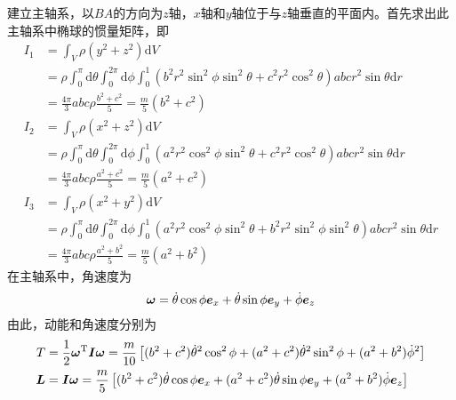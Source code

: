 \begin{solution}
建立主轴系，以$BA$的方向为$z$轴，$x$轴和$y$轴位于与$z$轴垂直的平面内。首先求出此主轴系中椭球的惯量矩阵，即
\begin{align*}
	I_1 & = \int_V \rho (y^2+z^2) \mathrm{d} V \\
	& = \rho \int_0^\pi \mathrm{d} \theta \int_0^{2\pi} \mathrm{d} \phi \int_0^1 (b^2r^2\sin^2 \phi \sin^2 \theta + c^2r^2 \cos^2 \theta) abc r^2 \sin \theta \mathrm{d} r \\
	& = \frac{4\pi}{3} abc \rho \frac{b^2+c^2}{5} = \frac{m}{5} (b^2+c^2) \\
	I_2 & = \int_V \rho (x^2+z^2) \mathrm{d} V \\
	& = \rho \int_0^\pi \mathrm{d} \theta \int_0^{2\pi} \mathrm{d} \phi \int_0^1 (a^2r^2\cos^2 \phi \sin^2 \theta + c^2r^2 \cos^2 \theta) abc r^2 \sin \theta \mathrm{d} r \\
	& = \frac{4\pi}{3} abc \rho \frac{a^2+c^2}{5} = \frac{m}{5} (a^2+c^2) \\
	I_3 & = \int_V \rho (x^2+y^2) \mathrm{d} V \\
	& = \rho \int_0^\pi \mathrm{d} \theta \int_0^{2\pi} \mathrm{d} \phi \int_0^1 (a^2r^2\cos^2 \phi \sin^2 \theta + b^2r^2 \sin^2 \phi \sin^2 \theta) abc r^2 \sin \theta \mathrm{d} r \\
	& = \frac{4\pi}{3} abc \rho \frac{a^2+b^2}{5} = \frac{m}{5} (a^2+b^2)
\end{align*}
在主轴系中，角速度为
\begin{equation*}
	\boldsymbol{\omega} = \dot{\theta} \cos \phi \boldsymbol{e}_x + \dot{\theta} \sin \phi \boldsymbol{e}_y + \dot{\phi} \boldsymbol{e}_z 
\end{equation*}
由此，动能和角速度分别为
\begin{align*}
	T & = \frac12 \boldsymbol{\omega}^{\mathrm{T}} \boldsymbol{I} \boldsymbol{\omega} = \frac{m}{10} \left[(b^2+c^2) \dot{\theta}^2 \cos^2 \phi + (a^2+c^2) \dot{\theta}^2 \sin^2 \phi + (a^2+b^2) \dot{\phi}^2\right] \\
	\boldsymbol{L} & = \boldsymbol{I} \boldsymbol{\omega} = \frac{m}{5} \left[(b^2+c^2) \dot{\theta} \cos \phi \boldsymbol{e}_x + (a^2+c^2) \dot{\theta} \sin \phi \boldsymbol{e}_y + (a^2+b^2) \dot{\phi} \boldsymbol{e}_z \right]
\end{align*}
\end{solution}

\iffalse
\begin{question}[金尚年《理论力学》148页4.29]
对称Lagrange陀螺的轴位于铅直位置，陀螺以很大的角速度$\omega$作稳定的自转。今突然在离定点$d$处作用一与陀螺的垂直轴垂直的冲量$p$。证明在陀螺此后的运动中，最大章动角近似为$2\arctan \dfrac{pd}{I_3 \omega}$。
\end{question}
\begin{solution}

\end{solution}

作业：p146-149，4.29（Lagrange陀螺），4.31

\subsection{非惯性系}\fi

